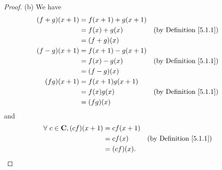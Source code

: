 \begin{proof}{(b)}
    We have
    \begin{align*}
        (f + g)(x + 1) & = f(x + 1) + g(x + 1)                                      \\
                       & = f(x) + g(x)         & \text{(by Definition \ref{5.1.1})} \\
                       & = (f + g)(x)                                               \\
        (f - g)(x + 1) & = f(x + 1) - g(x + 1)                                      \\
                       & = f(x) - g(x)         & \text{(by Definition \ref{5.1.1})} \\
                       & = (f - g)(x)                                               \\
        (f g)(x + 1)   & = f(x + 1) g(x + 1)                                        \\
                       & = f(x) g(x)           & \text{(by Definition \ref{5.1.1})} \\
                       & = (f g)(x)
    \end{align*}
    and
    \begin{align*}
        \forall\ c \in \mathbf{C}, (c f)(x + 1) & = c f(x + 1)                                      \\
                                                & = c f(x)     & \text{(by Definition \ref{5.1.1})} \\
                                                & = (c f)(x).
    \end{align*}
\end{proof}

